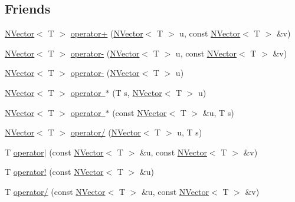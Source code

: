 \subsection*{Friends}
\begin{DoxyCompactItemize}
\item 
\mbox{\hyperlink{class_n_vector}{N\+Vector}}$<$ T $>$ \mbox{\hyperlink{class_n_vector_a302d1dc15ce109264b050fb074518981}{operator+}} (\mbox{\hyperlink{class_n_vector}{N\+Vector}}$<$ T $>$ u, const \mbox{\hyperlink{class_n_vector}{N\+Vector}}$<$ T $>$ \&v)
\item 
\mbox{\hyperlink{class_n_vector}{N\+Vector}}$<$ T $>$ \mbox{\hyperlink{class_n_vector_a870ba98635d7984c826f2d1f60d8b4e3}{operator-\/}} (\mbox{\hyperlink{class_n_vector}{N\+Vector}}$<$ T $>$ u, const \mbox{\hyperlink{class_n_vector}{N\+Vector}}$<$ T $>$ \&v)
\item 
\mbox{\hyperlink{class_n_vector}{N\+Vector}}$<$ T $>$ \mbox{\hyperlink{class_n_vector_a3991d193c344ff47ee71380879b7b2a2}{operator-\/}} (\mbox{\hyperlink{class_n_vector}{N\+Vector}}$<$ T $>$ u)
\item 
\mbox{\hyperlink{class_n_vector}{N\+Vector}}$<$ T $>$ \mbox{\hyperlink{class_n_vector_aee06ce5bbd64e05216ebdf521d77aa35}{operator $\ast$}} (T s, \mbox{\hyperlink{class_n_vector}{N\+Vector}}$<$ T $>$ u)
\item 
\mbox{\hyperlink{class_n_vector}{N\+Vector}}$<$ T $>$ \mbox{\hyperlink{class_n_vector_ab1ec596666b587300410f8fa459f295d}{operator $\ast$}} (const \mbox{\hyperlink{class_n_vector}{N\+Vector}}$<$ T $>$ \&u, T s)
\item 
\mbox{\hyperlink{class_n_vector}{N\+Vector}}$<$ T $>$ \mbox{\hyperlink{class_n_vector_a56643335b5a0b0b07abe89e2cac8a5de}{operator/}} (\mbox{\hyperlink{class_n_vector}{N\+Vector}}$<$ T $>$ u, T s)
\item 
T \mbox{\hyperlink{class_n_vector_a193c63fac7e6b9528c854fd94ee76030}{operator$\vert$}} (const \mbox{\hyperlink{class_n_vector}{N\+Vector}}$<$ T $>$ \&u, const \mbox{\hyperlink{class_n_vector}{N\+Vector}}$<$ T $>$ \&v)
\item 
T \mbox{\hyperlink{class_n_vector_a697b7e9e059d8045dc5f682f94521548}{operator!}} (const \mbox{\hyperlink{class_n_vector}{N\+Vector}}$<$ T $>$ \&u)
\item 
T \mbox{\hyperlink{class_n_vector_a28eb7e90bdbd558f19beb9faebb1de1f}{operator/}} (const \mbox{\hyperlink{class_n_vector}{N\+Vector}}$<$ T $>$ \&u, const \mbox{\hyperlink{class_n_vector}{N\+Vector}}$<$ T $>$ \&v)
\item 

\end{DoxyCompactItemize}

